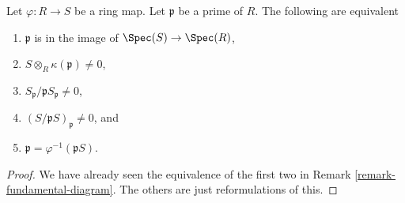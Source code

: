 \begin{lemma}
\label{lemma-in-image}
Let $\varphi : R \to S$ be a ring map. Let $\mathfrak p$
be a prime of $R$. The following are equivalent
\begin{enumerate}
\item $\mathfrak p$ is in the image of
$\Spec(S) \to \Spec(R)$,
\item $S \otimes_R \kappa(\mathfrak p) \not = 0$,
\item $S_{\mathfrak p}/\mathfrak p S_{\mathfrak p} \not = 0$,
\item $(S/\mathfrak pS)_{\mathfrak p} \not = 0$, and
\item $\mathfrak p = \varphi^{-1}(\mathfrak pS)$.
\end{enumerate}
\end{lemma}

\begin{proof}
We have already seen the equivalence of the first two
in Remark \ref{remark-fundamental-diagram}. The others
are just reformulations of this.
\end{proof}